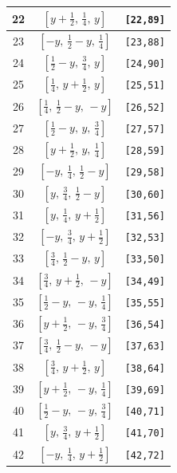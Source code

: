 \documentclass[fleqn,8pt]{jsarticle}
\begin{document}
\begin{longtable}{ccc}
22 & $\left[ y + \frac{1}{2},\, \frac{1}{4},\, y \right]$ & {\tt [22,89]} \\ \hline
23 & $\left[ - y,\, \frac{1}{2} - y,\, \frac{1}{4} \right]$ & {\tt [23,88]} \\ \hline
24 & $\left[ \frac{1}{2} - y,\, \frac{3}{4},\, y \right]$ & {\tt [24,90]} \\ \hline
25 & $\left[ \frac{1}{4},\, y + \frac{1}{2},\, y \right]$ & {\tt [25,51]} \\ \hline
26 & $\left[ \frac{1}{4},\, \frac{1}{2} - y,\, - y \right]$ & {\tt [26,52]} \\ \hline
27 & $\left[ \frac{1}{2} - y,\, y,\, \frac{3}{4} \right]$ & {\tt [27,57]} \\ \hline
28 & $\left[ y + \frac{1}{2},\, y,\, \frac{1}{4} \right]$ & {\tt [28,59]} \\ \hline
29 & $\left[ - y,\, \frac{1}{4},\, \frac{1}{2} - y \right]$ & {\tt [29,58]} \\ \hline
30 & $\left[ y,\, \frac{3}{4},\, \frac{1}{2} - y \right]$ & {\tt [30,60]} \\ \hline
31 & $\left[ y,\, \frac{1}{4},\, y + \frac{1}{2} \right]$ & {\tt [31,56]} \\ \hline
32 & $\left[ - y,\, \frac{3}{4},\, y + \frac{1}{2} \right]$ & {\tt [32,53]} \\ \hline
33 & $\left[ \frac{3}{4},\, \frac{1}{2} - y,\, y \right]$ & {\tt [33,50]} \\ \hline
34 & $\left[ \frac{3}{4},\, y + \frac{1}{2},\, - y \right]$ & {\tt [34,49]} \\ \hline
35 & $\left[ \frac{1}{2} - y,\, - y,\, \frac{1}{4} \right]$ & {\tt [35,55]} \\ \hline
36 & $\left[ y + \frac{1}{2},\, - y,\, \frac{3}{4} \right]$ & {\tt [36,54]} \\ \hline
37 & $\left[ \frac{3}{4},\, \frac{1}{2} - y,\, - y \right]$ & {\tt [37,63]} \\ \hline
38 & $\left[ \frac{3}{4},\, y + \frac{1}{2},\, y \right]$ & {\tt [38,64]} \\ \hline
39 & $\left[ y + \frac{1}{2},\, - y,\, \frac{1}{4} \right]$ & {\tt [39,69]} \\ \hline
40 & $\left[ \frac{1}{2} - y,\, - y,\, \frac{3}{4} \right]$ & {\tt [40,71]} \\ \hline
41 & $\left[ y,\, \frac{3}{4},\, y + \frac{1}{2} \right]$ & {\tt [41,70]} \\ \hline
42 & $\left[ - y,\, \frac{1}{4},\, y + \frac{1}{2} \right]$ & {\tt [42,72]} \\ \hline

\end{longtable}
\end{document}
